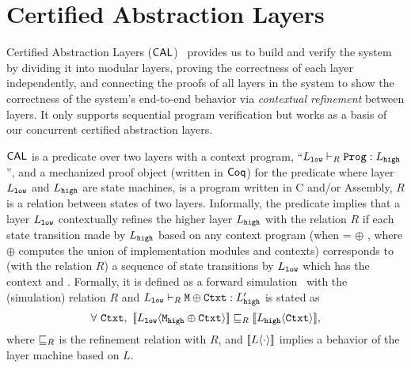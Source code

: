 \section{Certified Abstraction Layers}
\label{chapter:ccal:sec:cal}

Certified Abstraction Layers ($\mathsf{CAL}$)~\cite{deepspec} provides us to build and verify the system by dividing it into modular layers, 
proving the correctness of each layer independently, and connecting the proofs of all layers in the system to show the correctness of the system's end-to-end behavior via \textit{contextual refinement} between layers. 
It only supports sequential program verification but works as a basis of our concurrent certified abstraction layers.

$\mathsf{CAL}$ is a predicate over two layers with a context program, 
``$L_{{\mathrm{\texttt{low}}}} \vdash_{R} {\mathrm{\texttt{Prog}}} : L_{{\mathrm{\texttt{high}}}}$'', 
and a mechanized proof object (written in $\mathsf{Coq}$) for the predicate where layer $L_{{\mathrm{\texttt{low}}}}$ and $L_{{\mathrm{\texttt{high}}}}$ are state machines,  is a program written in C and/or Assembly, $R$ is a relation between states of two layers.
Informally, the predicate implies that 
a layer $L_{{\mathrm{\texttt{low}}}}$ contextually refines the higher layer $L_{{\mathrm{\texttt{high}}}}$ with the relation $R$
 if each state transition made by $L_{{\mathrm{\texttt{high}}}}$ based on any context program  (when  =  $\oplus$ , where $\oplus$ computes the union of implementation modules and contexts) corresponds to (with the relation $R$)  a sequence of 
 state transitions by $L_{{\mathrm{\texttt{low}}}}$ which has the context  and  .
 Formally, it is defined as a forward simulation~\cite{Lynch95,leroy09,Milner71,Park81} with the (simulation) relation $R$
 and  $L_{{\mathrm{\texttt{low}}}} \vdash_{R} {\mathrm{\texttt{M}}} \oplus {\mathrm{\texttt{Ctxt}}} : L_{{\mathrm{\texttt{high}}}}'$ is stated as
$$\forall\ \codeinmath{Ctxt},\ \sem{L_{\codeinmath{low}}}{\codeinmath{M}_{\codeinmath{high}} \oplus \codeinmath{Ctxt}} \refines_{R} \sem{L_{\codeinmath{high}}}{\codeinmath{Ctxt}},$$
where $\sqsubseteq_{R}$ is the refinement relation with $R$, and $[\![{L} \langle {\cdot} \rangle]\!]$ implies  a  behavior of the layer machine based on $L$.


